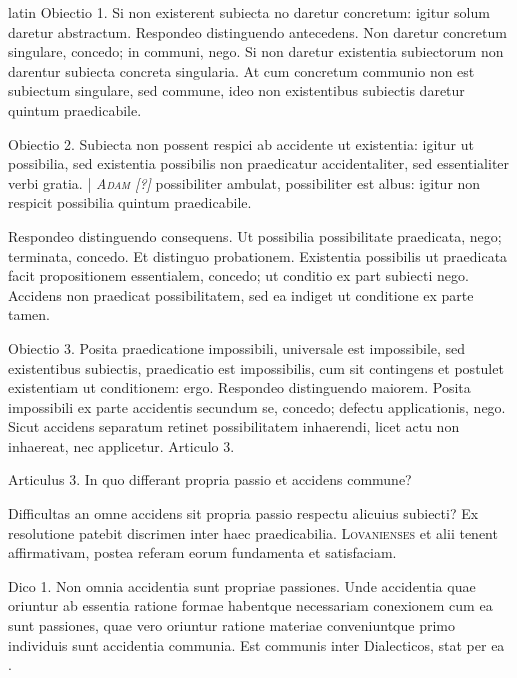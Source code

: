 \begin{otherlanguage*}{latin}
\pstart
  Obiectio 1. Si non existerent subiecta no daretur concretum: igitur solum daretur abstractum. Respondeo distinguendo antecedens. Non daretur concretum singulare, concedo; in communi, nego. Si non daretur existentia subiectorum non darentur subiecta concreta singularia. At cum concretum communio non est subiectum singulare, sed commune, ideo non existentibus subiectis daretur quintum praedicabile. 
\pend

\pstart
  Obiectio 2. Subiecta non possent respici ab accidente ut existentia: igitur ut possibilia, sed existentia possibilis non praedicatur accidentaliter, sed essentialiter verbi gratia. \textnormal{|}   \textsc{\emph{Adam [?]}}\index[persons]{} possibiliter ambulat, possibiliter est albus: igitur non respicit possibilia quintum praedicabile. 
\pend

\pstart
  Respondeo distinguendo consequens. Ut possibilia possibilitate praedicata, nego; terminata, concedo. Et distinguo probationem. Existentia possibilis ut praedicata facit propositionem essentialem, concedo; ut conditio ex part subiecti nego. Accidens non praedicat possibilitatem, sed ea indiget ut conditione ex parte tamen. 
\pend

\pstart
  Obiectio 3. Posita praedicatione impossibili, universale est impossibile, sed existentibus subiectis, praedicatio est impossibilis, cum sit contingens et postulet existentiam ut conditionem: ergo. Respondeo distinguendo maiorem. Posita impossibili ex parte accidentis secundum se, concedo; defectu applicationis, nego. Sicut accidens separatum retinet possibilitatem inhaerendi, licet actu non inhaereat, nec applicetur. Articulo 3. 
\pend

        \pstart
        \pend
      
\pstart
\noindent%
 Articulus 3. In quo differant propria passio et accidens commune? 
\pend

\pstart
  Difficultas an omne accidens sit propria passio respectu alicuius subiecti? Ex resolutione patebit discrimen inter haec praedicabilia. \textsc{Lovanienses}\index[persons]{} et alii tenent affirmativam, postea referam eorum fundamenta et satisfaciam. 
\pend

\pstart
  Dico 1. Non omnia accidentia sunt propriae passiones. Unde accidentia quae oriuntur ab essentia ratione formae habentque necessariam conexionem cum ea sunt passiones, quae vero oriuntur ratione materiae conveniuntque primo individuis sunt accidentia communia. Est communis inter Dialecticos, stat per ea . 
\pend


\end{otherlanguage*}
